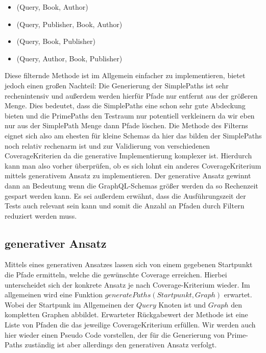 \begin{itemize}
    \item (Query, Book, Author)
    \item (Query, Publisher, Book, Author)
    \item (Query, Book, Publisher)
    \item (Query, Author, Book, Publisher)
\end{itemize}

Diese filternde Methode ist im Allgemein einfacher zu implementieren, bietet jedoch einen großen Nachteil:
Die Generierung der SimplePaths ist sehr rechenintensiv und außerdem werden hierfür Pfade nur entfernt aus der größeren Menge.
Dies bedeutet, dass die SimplePaths eine schon sehr gute Abdeckung bieten und die PrimePaths den Testraum nur potentiell verkleinern da wir eben
nur aus der SimplePath Menge dann Pfade löschen.
Die Methode des Filterns eignet sich also am ehesten für kleine Schemas da hier das bilden der SimplePaths noch relativ rechenarm
ist und zur Validierung von verschiedenen CoverageKriterien da die generative Implementierung komplexer ist.
Hierdurch kann man also vorher überprüfen, ob es sich lohnt ein anderes CoverageKriterium mittels generativem Ansatz zu implementieren.
Der generative Ansatz gewinnt dann an Bedeutung wenn die GraphQL-Schemas größer werden da so Rechenzeit gespart werden kann.
Es sei außerdem erwähnt, dass die Ausführungszeit der Tests auch relevant sein kann und somit die Anzahl an Pfaden durch Filtern reduziert werden muss.

\subsection{generativer Ansatz}

Mittels eines generativen Ansatzes lassen sich von einem gegebenen Startpunkt die Pfade ermitteln, welche die gewünschte Coverage
erreichen.
Hierbei unterscheidet sich der konkrete Ansatz je nach Coverage-Kriterium wieder.
Im allgemeinen wird eine Funktion $generatePaths(Startpunkt, Graph)$ erwartet.
Wobei der Startpunk im Allgemeinen der $Query$ Knoten ist und $Graph$ den kompletten Graphen abbildet.
Erwarteter Rückgabewert der Methode ist eine Liste von Pfaden die das jeweilige CoverageKriterium erfüllen.
Wir werden auch hier wieder einen Pseudo Code vorstellen, der für die Generierung von Prime-Paths zuständig ist aber allerdings
den generativen Ansatz verfolgt.

